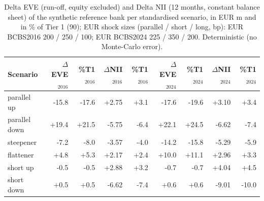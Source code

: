 \begin{table}[H]
\centering
\scriptsize
\caption{Delta EVE (run-off, equity excluded) and Delta NII (12 months, constant balance sheet) of the synthetic reference bank per standardised scenario, in EUR m and in \% of Tier 1 (90); EUR shock sizes (parallel / short / long, bp): EUR BCBS2016 200 / 250 / 100; EUR BCBS2024 225 / 350 / 200. Deterministic (no Monte-Carlo error).}
\label{tab:R1_scenarios}
\setlength{\tabcolsep}{3pt}
\begin{tabular}{lrrrrrrrr}
\toprule
Scenario & $\Delta$EVE$_{2016}$ & \%T1$_{2016}$ & $\Delta$NII$_{2016}$ & \%T1$_{2016}$ & $\Delta$EVE$_{2024}$ & \%T1$_{2024}$ & $\Delta$NII$_{2024}$ & \%T1$_{2024}$ \\
\midrule
parallel up & -15.8 & -17.6 & +2.75 & +3.1 & -17.6 & -19.6 & +3.10 & +3.4 \\
parallel down & +19.4 & +21.5 & -5.75 & -6.4 & +22.1 & +24.5 & -6.62 & -7.4 \\
steepener & -7.2 & -8.0 & -3.57 & -4.0 & -14.2 & -15.8 & -5.29 & -5.9 \\
flattener & +4.8 & +5.3 & +2.17 & +2.4 & +10.0 & +11.1 & +2.96 & +3.3 \\
short up & -0.5 & -0.5 & +2.88 & +3.2 & -0.7 & -0.7 & +4.04 & +4.5 \\
short down & +0.5 & +0.5 & -6.62 & -7.4 & +0.6 & +0.6 & -9.01 & -10.0 \\
\bottomrule
\end{tabular}
\end{table}
